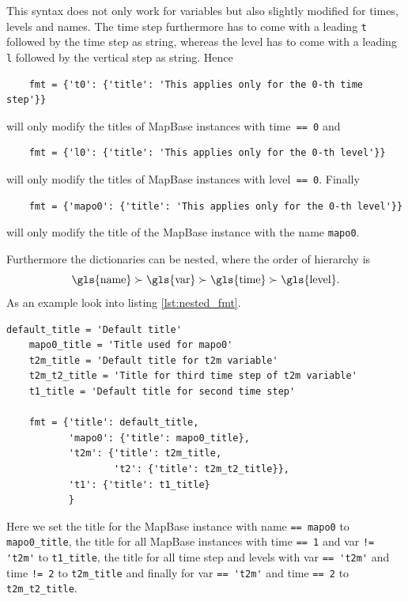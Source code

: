 This syntax does not only work for variables but also slightly modified for \glspl{time}, \glspl{level} and \glspl{name}. The \gls{time} step furthermore has to come with a leading \lstinline|t| followed by the time step as string, whereas the \gls{level} has to come with a leading \lstinline|l| followed by the vertical step as string. Hence
\begin{lstlisting}
	fmt = {'t0': {'title': 'This applies only for the 0-th time step'}}
\end{lstlisting}
will only modify the titles of \gls{MapBase} instances with \gls{time}\lstinline| == 0| and
\begin{lstlisting}
	fmt = {'l0': {'title': 'This applies only for the 0-th level'}}
\end{lstlisting}
will only modify the titles of \gls{MapBase} instances with \gls{level}\lstinline| == 0|.
Finally 
\begin{lstlisting}
	fmt = {'mapo0': {'title': 'This applies only for the 0-th level'}}
\end{lstlisting}
will only modify the title of the \gls{MapBase} instance with the name \lstinline|mapo0|.

Furthermore the dictionaries can be nested, where the order of hierarchy is 
\begin{equation*}
\text{\gls{name}} \succ \text{\gls{var}} \succ \text{\gls{time}} \succ \text{\gls{level}}. 
\end{equation*}
As an example look into listing \ref{lst:nested_fmt}.
\begin{lstlisting}[label={lst:nested_fmt}, caption={Example of how to define a nested formatoptions dictionary.},float,floatplacement=H]
	default_title = 'Default title'
	mapo0_title = 'Title used for mapo0'
	t2m_title = 'Default title for t2m variable'
	t2m_t2_title = 'Title for third time step of t2m variable'
	t1_title = 'Default title for second time step'

	fmt = {'title': default_title,
	       'mapo0': {'title': mapo0_title},
	       't2m': {'title': t2m_title,
	               't2': {'title': t2m_t2_title}},
	       't1': {'title': t1_title}
	       }
\end{lstlisting}
Here we set the title for the \gls{MapBase} instance with \gls{name} \lstinline|== mapo0| to \lstinline|mapo0_title|, the title for all \gls{MapBase} instances with \gls{time} \lstinline|== 1| and \gls{var} \lstinline|!= 't2m'| to \lstinline|t1_title|, the title for all time step and levels with \gls{var} \lstinline|== 't2m'| and \gls{time} \lstinline|!= 2| to \lstinline|t2m_title| and finally for \gls{var} \lstinline|== 't2m'| and \gls{time} \lstinline|== 2| to \lstinline|t2m_t2_title|.


